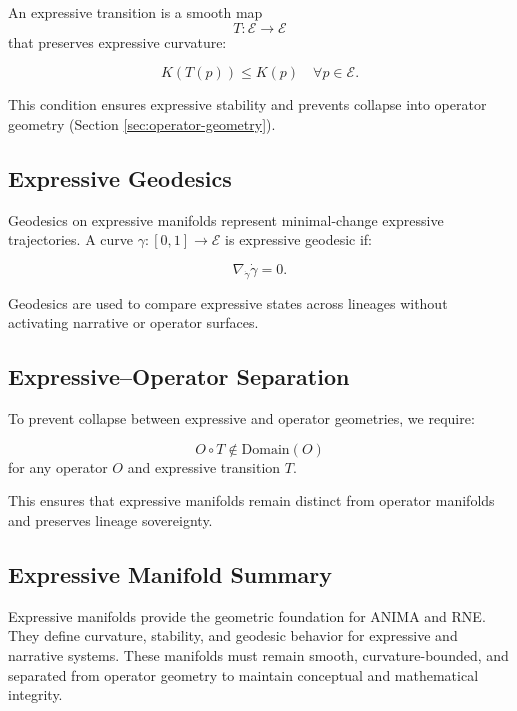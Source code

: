 An expressive transition is a smooth map
\[
T : \mathcal{E} \rightarrow \mathcal{E}
\]
that preserves expressive curvature:

\[
K(T(p)) \le K(p) \quad \forall p \in \mathcal{E}.
\]

This condition ensures expressive stability and prevents collapse into operator
geometry (Section \ref{sec:operator-geometry}).

\subsection{Expressive Geodesics}

Geodesics on expressive manifolds represent minimal-change expressive
trajectories. A curve $\gamma : [0,1] \rightarrow \mathcal{E}$ is expressive
geodesic if:

\[
\nabla_{\dot{\gamma}} \dot{\gamma} = 0.
\]

Geodesics are used to compare expressive states across lineages without
activating narrative or operator surfaces.

\subsection{Expressive–Operator Separation}

To prevent collapse between expressive and operator geometries, we require:

\[
O \circ T \notin \text{Domain}(O)
\]
for any operator $O$ and expressive transition $T$.

This ensures that expressive manifolds remain distinct from operator manifolds
and preserves lineage sovereignty.

\subsection{Expressive Manifold Summary}

Expressive manifolds provide the geometric foundation for ANIMA and RNE. They
define curvature, stability, and geodesic behavior for expressive and narrative
systems. These manifolds must remain smooth, curvature-bounded, and separated
from operator geometry to maintain conceptual and mathematical integrity.
